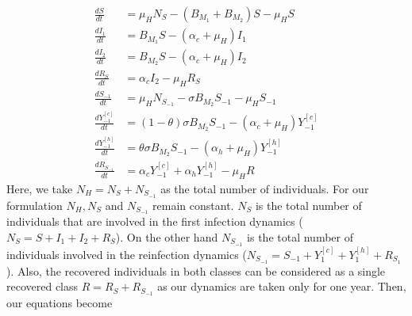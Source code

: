
\begin{equation}\label{eqn:model_two_strains1}
    \begin{aligned}
        \frac{dS}{dt} &=
            \mu_HN_S - (B_{M_1} + B_{M_2}) S
            -\mu_H S
        \\
        \frac{dI_1}{dt} &=
            B_{M_1} S
            -(\alpha_c + \mu_H) I_1
        \\
        \frac{dI_2}{dt} &=
            B_{M_2} S
            -(\alpha_c + \mu_H)I_2
        \\
        \frac{dR_S}{dt}&=\alpha_c I_2-\mu_H R_S
        \\
        \frac{dS_{-1}}{dt} &=
            \mu_HN_{S_{-1}}- \sigma B_{M_2} S_{-1}-\mu_H S_{-1}
        \\
        \frac{dY_{-1} ^{[c]} }{dt} &=
            (1 - \theta) \sigma B_{M_2} S_{-1}
            -(\alpha_c + \mu_H) Y_{-1} ^ {[c]}
        \\
        \frac{dY_{-1}^{[h]}}{dt} &=
            \theta \sigma B_{M_2} S_{-1}
            -(\alpha_h + \mu_H)Y_{-1} ^{[h]} 
        \\
        \frac{dR_{S_{-1}}}{dt} &= 
            \alpha_c Y_{-1} ^{[c]}
            + \alpha_h Y_{-1} ^ {[h]} - \mu_H R
    \end{aligned}
\end{equation}
    Here, we take $N_H=N_S+N_{S_{-1}}$ as the total number of individuals.
    For our formulation $N_H, N_S$ and $N_{S_{-1}}$ remain constant. $N_S$
    is the total number of individuals that are involved in the first
    infection dynamics ($N_S = S +I_1+I_2+R_S$). On the other hand
    $N_{S_{-1}}$ is the total number of individuals involved in the
    reinfection dynamics ($N_{S_{-1}}=S_{-1}+Y_1^{[c]}+
    Y_1^{[h]}+R_{S_1}$). Also, the recovered individuals in both classes
    can be considered as a single recovered class $R=R_S+R_{S_{-1}}$ as
    our dynamics are taken only for one year. Then, our equations become

